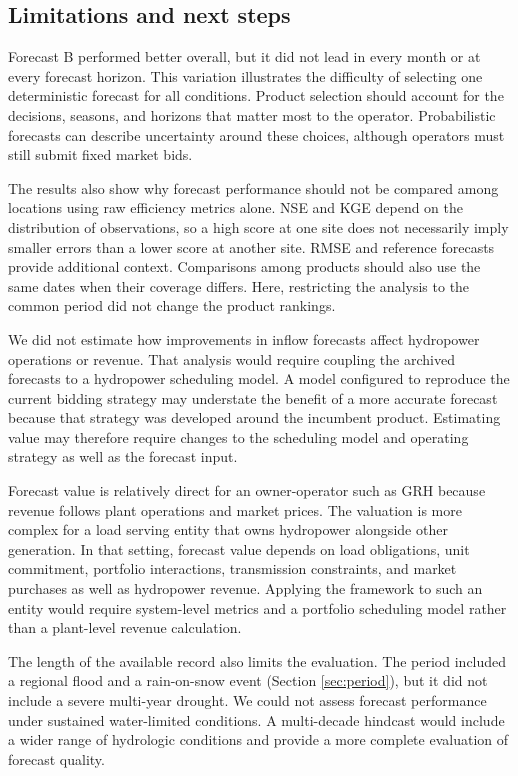 \documentclass[MLA]{USG} %
\begin{document}
\subsection{Limitations and next steps}

Forecast B performed better overall, but it did not lead in every month or at every forecast horizon. This variation illustrates the difficulty of selecting one deterministic forecast for all conditions. Product selection should account for the decisions, seasons, and horizons that matter most to the operator. Probabilistic forecasts can describe uncertainty around these choices, although operators must still submit fixed market bids.

The results also show why forecast performance should not be compared among locations using raw efficiency metrics alone. NSE and KGE depend on the distribution of observations, so a high score at one site does not necessarily imply smaller errors than a lower score at another site. RMSE and reference forecasts provide additional context. Comparisons among products should also use the same dates when their coverage differs. Here, restricting the analysis to the common period did not change the product rankings.

We did not estimate how improvements in inflow forecasts affect hydropower operations or revenue. That analysis would require coupling the archived forecasts to a hydropower scheduling model. A model configured to reproduce the current bidding strategy may understate the benefit of a more accurate forecast because that strategy was developed around the incumbent product. Estimating value may therefore require changes to the scheduling model and operating strategy as well as the forecast input.

Forecast value is relatively direct for an owner-operator such as GRH because revenue follows plant operations and market prices. The valuation is more complex for a load serving entity that owns hydropower alongside other generation. In that setting, forecast value depends on load obligations, unit commitment, portfolio interactions, transmission constraints, and market purchases as well as hydropower revenue. Applying the framework to such an entity would require system-level metrics and a portfolio scheduling model rather than a plant-level revenue calculation.

The length of the available record also limits the evaluation. The period included a regional flood and a rain-on-snow event (Section \ref{sec:period}), but it did not include a severe multi-year drought. We could not assess forecast performance under sustained water-limited conditions. A multi-decade hindcast would include a wider range of hydrologic conditions and provide a more complete evaluation of forecast quality.
\end{document}
